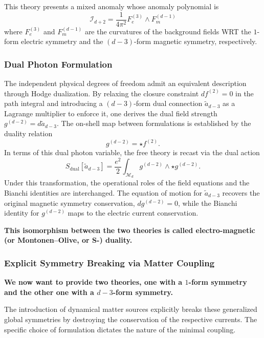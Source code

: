 \documentclass[aps,preprint,nofootinbib,preprintnumbers,eqsecnum,superscriptaddress]{revtex4}
\numberwithin{equation}{section}
\begin{document}
This theory presents a mixed anomaly whose anomaly polynomial is 
\[
\mathcal{I}_{d+2} = \frac{1}{4\pi^2} F^{(3)}_e \wedge F^{(d-1)}_m
\]
where $F^{(3)}_e $ and $ F^{(d-1)}_m$ are the curvatures of the background fields WRT the $1$-form electric symmetry and the $(d-3)$-form magnetic symmetry, respectively.

\subsubsection{Dual Photon Formulation}
\label{subsec:dual_photon}

The independent physical degrees of freedom admit an equivalent description through Hodge dualization. By relaxing the closure constraint $df^{(2)} = 0$ in the path integral and introducing a $(d-3)$-form dual connection $\tilde{a}_{d-3}$ as a Lagrange multiplier to enforce it, one derives the dual field strength $g^{(d-2)} = d\tilde{a}_{d-3}$. The on-shell map between formulations is established by the duality relation
\begin{equation}
g^{(d-2)} = \star f^{(2)}.
\end{equation}
In terms of this dual photon variable, the free theory is recast via the dual action
\begin{equation}
S_{\text{dual}}[\tilde{a}_{d-3}] = \frac{e^2}{2} \int_{\mathcal{M}_d} g^{(d-2)} \wedge \star g^{(d-2)}.
\end{equation}
Under this transformation, the operational roles of the field equations and the Bianchi identities are interchanged. The equation of motion for $\tilde{a}_{d-3}$ recovers the original magnetic symmetry conservation, $dg^{(d-2)}=0$, while the Bianchi identity for $g^{(d-2)}$ maps to the electric current conservation.

{\bf This isomorphism between the two theories is called electro-magnetic (or Montonen–Olive, or S-) duality.}

\subsubsection{Explicit Symmetry Breaking via Matter Coupling}
\label{subsec:matter_coupling}

{\bf We now want to provide two theories, one with a $1$-form symmetry and the other one with a $d-3$-form symmetry.}

The introduction of dynamical matter sources explicitly breaks these generalized global symmetries by destroying the conservation of the respective currents. The specific choice of formulation dictates the nature of the minimal coupling.
\end{document}
